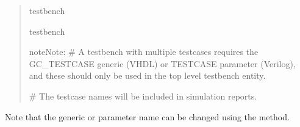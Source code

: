 \documentclass[letterpaper,10pt,english]{sphinxmanual}
\begin{document}
\begin{quote}
\sphinxAtStartPar
{} testbench

\begin{sphinxVerbatim}[commandchars=\\\{\}]
\end{sphinxVerbatim}

\sphinxAtStartPar
{} testbench

\begin{sphinxVerbatim}[commandchars=\\\{\}]
\end{sphinxVerbatim}

\begin{sphinxadmonition}{note}{Note:}
\sphinxAtStartPar
\# A testbench with multiple testcases requires the GC\_TESTCASE generic (VHDL) or TESTCASE parameter
(Verilog), and these should only be used in the top level testbench entity.

\sphinxAtStartPar
\# The testcase names will be included in simulation reports.
\end{sphinxadmonition}

\begin{sphinxVerbatim}[commandchars=\\\{\}]
\end{sphinxVerbatim}
\end{quote}

\sphinxAtStartPar
Note that the  generic or  parameter name can be changed using
the {\hyperref[\detokenize{api:set-testcase-identifier-name}]{}} method.
\end{document}
